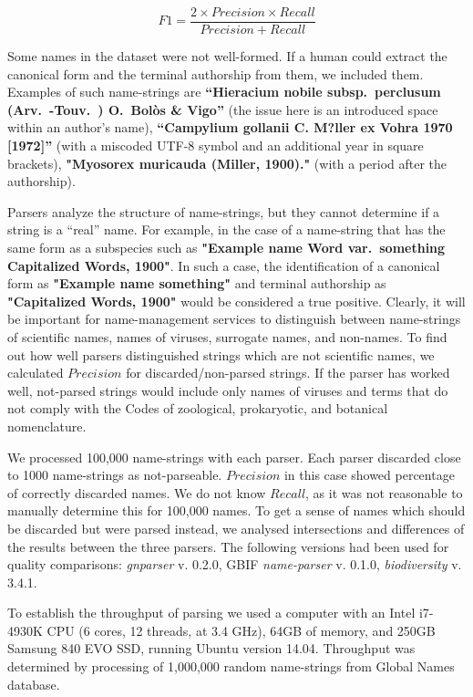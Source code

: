 \documentclass{bmcart}
\begin{document}
\[F1 = \dfrac{2 \times Precision \times Recall}{Precision + Recall}\]


Some names in the dataset were not well-formed. If a human could extract the canonical form and the terminal authorship from them, we included them.  Examples of such name-strings are \textbf{``Hieracium nobile subsp.\ perclusum (Arv.\ -Touv.\ ) O.\ Bolòs \& Vigo''} (the issue here is an introduced space within an author's name), \textbf{``Campylium gollanii C. M?ller ex Vohra 1970 [1972]''} (with a miscoded UTF-8 symbol and an additional year in square brackets), \textbf{"Myosorex muricauda (Miller, 1900)."} (with a period after the authorship).

Parsers analyze the structure of name-strings, but they cannot determine if a string is a ``real'' name. For example, in the case of a name-string that has the same form as a subspecies such as \textbf{"Example name Word var.\ something Capitalized Words, 1900"}. In such a case, the identification of a canonical form as \textbf{"Example name something"} and terminal authorship as \textbf{"Capitalized Words, 1900"} would be considered a true positive.  Clearly, it will be important for name-management services to distinguish between name-strings of scientific names, names of viruses, surrogate names, and non-names. To find out how well parsers distinguished strings which are not scientific names, we calculated $Precision$ for discarded/non-parsed strings.  If the parser has worked well, not-parsed strings would include only names of viruses and terms that do not comply with the Codes of zoological, prokaryotic, and botanical nomenclature.

We processed 100,000 name-strings with each parser. Each parser discarded close to 1000 name-strings as not-parseable. $Precision$ in this case showed percentage of correctly discarded names. We do not know $Recall$, as it was not reasonable to manually determine this for 100,000 names. To get a sense of names which should be discarded but were parsed instead, we analysed intersections and differences of the results between the three parsers. The following versions had been used for quality comparisons: \textit{gnparser} v.  0.2.0, GBIF \textit{name-parser} v. 0.1.0, \textit{biodiversity} v. 3.4.1.

To establish the throughput of parsing we used a computer with an Intel i7-4930K CPU (6 cores, 12 threads, at 3.4 GHz), 64GB of memory, and 250GB Samsung 840 EVO SSD, running Ubuntu version 14.04. Throughput was determined by processing of 1,000,000 random name-strings from Global Names database.
\end{document}
